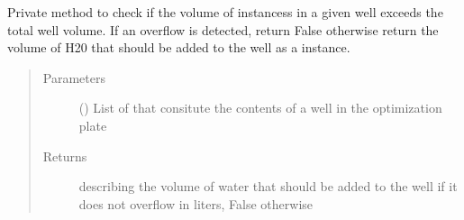 \documentclass[letterpaper,10pt,english]{sphinxmanual}
\begin{document}
\begin{fulllineitems}
\begin{fulllineitems}
\begin{quote}
\begin{description}
\begin{itemize}
\end{itemize}

\end{description}\end{quote}

\end{fulllineitems}


\begin{fulllineitems}
\label{\detokenize{polo.widgets:polo.widgets.optimize_widget.OptimizeWidget.HTML_ICON}}
\end{fulllineitems}


\begin{fulllineitems}
\label{\detokenize{polo.widgets:polo.widgets.optimize_widget.OptimizeWidget._check_for_overflow}}
Private method to check if the volume of 
instancess in a given well exceeds the total well volume. 
If an overflow is detected, return False otherwise return the volume 
of H20 that should be added 
to the well as a {\hyperref[\detokenize{polo.crystallography:polo.crystallography.cocktail.UnitValue}]{}}
instance.
\begin{quote}\begin{description}
\item[{Parameters}] \leavevmode
{} () \textendash{} List of  that consitute the contents of a
well in the optimization plate

\item[{Returns}] \leavevmode
{} describing the volume of water that should be
added to the well if it does not overflow in liters, 
False otherwise


\end{description}
\end{quote}
\end{fulllineitems}
\end{fulllineitems}
\end{document}
